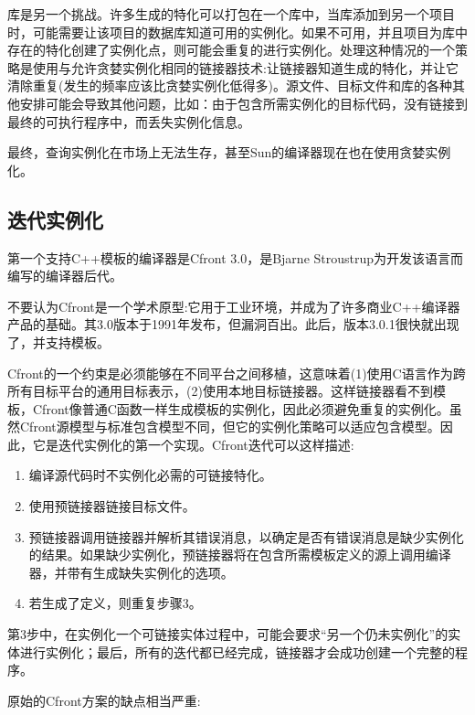 库是另一个挑战。许多生成的特化可以打包在一个库中，当库添加到另一个项目时，可能需要让该项目的数据库知道可用的实例化。如果不可用，并且项目为库中存在的特化创建了实例化点，则可能会重复的进行实例化。处理这种情况的一个策略是使用与允许贪婪实例化相同的链接器技术:让链接器知道生成的特化，并让它清除重复(发生的频率应该比贪婪实例化低得多)。源文件、目标文件和库的各种其他安排可能会导致其他问题，比如：由于包含所需实例化的目标代码，没有链接到最终的可执行程序中，而丢失实例化信息。

最终，查询实例化在市场上无法生存，甚至Sun的编译器现在也在使用贪婪实例化。

\subsection{迭代实例化}

第一个支持C++模板的编译器是Cfront 3.0，是Bjarne Stroustrup为开发该语言而编写的编译器后代。

\begin{notice}不要认为Cfront是一个学术原型:它用于工业环境，并成为了许多商业C++编译器产品的基础。其3.0版本于1991年发布，但漏洞百出。此后，版本3.0.1很快就出现了，并支持模板。
\end{notice}

Cfront的一个约束是必须能够在不同平台之间移植，这意味着(1)使用C语言作为跨所有目标平台的通用目标表示，(2)使用本地目标链接器。这样链接器看不到模板，Cfront像普通C函数一样生成模板的实例化，因此必须避免重复的实例化。虽然Cfront源模型与标准包含模型不同，但它的实例化策略可以适应包含模型。因此，它是迭代实例化的第一个实现。Cfront迭代可以这样描述:

\begin{enumerate}
\item 
编译源代码时不实例化必需的可链接特化。

\item 
使用预链接器链接目标文件。

\item 
预链接器调用链接器并解析其错误消息，以确定是否有错误消息是缺少实例化的结果。如果缺少实例化，预链接器将在包含所需模板定义的源上调用编译器，并带有生成缺失实例化的选项。

\item 
若生成了定义，则重复步骤3。
\end{enumerate}

第3步中，在实例化一个可链接实体过程中，可能会要求“另一个仍未实例化”的实体进行实例化；最后，所有的迭代都已经完成，链接器才会成功创建一个完整的程序。

原始的Cfront方案的缺点相当严重:


